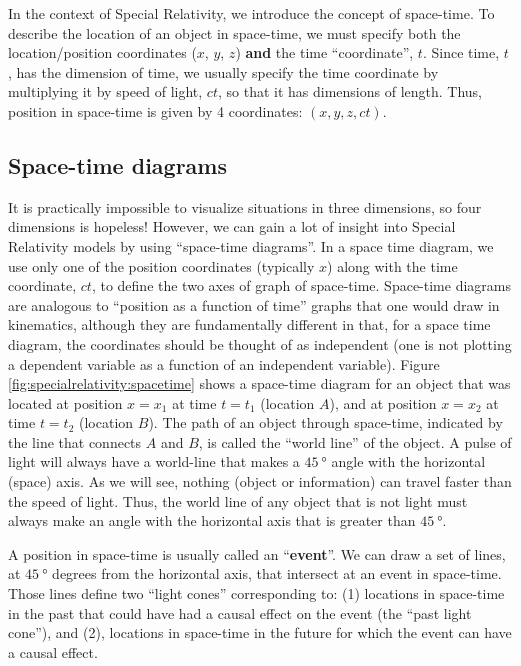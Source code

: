 In the context of Special Relativity, we introduce the concept of space-time. To describe the location of an object in space-time, we must specify both the location/position coordinates ($x$, $y$, $z$) \textbf{and} the time ``coordinate'', $t$. Since time, $t$, has the dimension of time, we usually specify the time coordinate by multiplying it by speed of light, $ct$, so that it has dimensions of length. Thus, position in space-time is given by 4 coordinates: $(x,y,z,ct)$.

 
\subsection{Space-time diagrams}
It is practically impossible to visualize situations in three dimensions, so four dimensions is hopeless! However, we can gain a lot of insight into Special Relativity models by using ``space-time diagrams''. In a space time diagram, we use only one of the position coordinates (typically $x$) along with the time coordinate, $ct$, to define the two axes of graph of space-time. Space-time diagrams are analogous to ``position as a function of time'' graphs that one would draw in kinematics, although they are fundamentally different in that, for a space time diagram, the coordinates should be thought of as independent (one is not plotting a dependent variable as a function of an independent variable).
Figure \ref{fig:specialrelativity:spacetime} shows a space-time diagram for an object that was located at position $x=x_1$ at time $t=t_1$ (location $A$), and at position $x=x_2$ at time $t=t_2$ (location $B$). The path of an object through space-time, indicated by the line that connects $A$ and $B$, is called the ``world line'' of the object.
A pulse of light will always have a world-line that makes a $\SI{45}{\degree}$ angle with the horizontal (space) axis. As we will see, nothing (object or information) can travel faster than the speed of light. Thus, the world line of any object that is not light must always make an angle with the horizontal axis that is greater than $\SI{45}{\degree}$.

A position in space-time is usually called an ``\textbf{event}''. We can draw a set of lines, at $\SI{45}{\degree}$ degrees from the horizontal axis, that intersect at an event in space-time. Those lines define two ``light cones'' corresponding to: (1) locations in space-time in the past that could have had a causal effect on the event (the ``past light cone''), and (2), locations in space-time in the future for which the event can have a causal effect.

